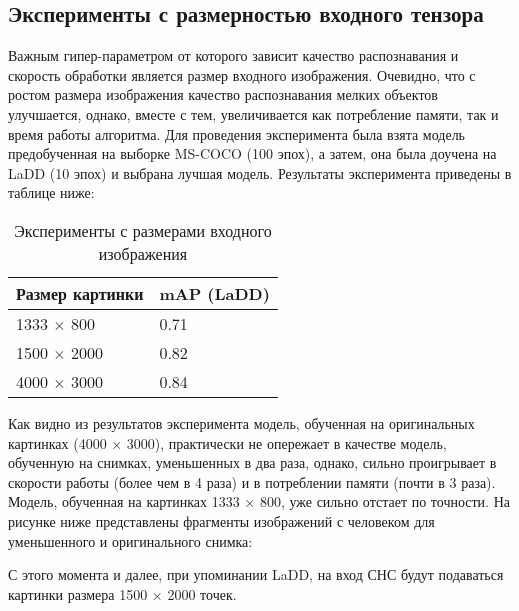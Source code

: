 \subsection{Эксперименты с размерностью входного тензора}

Важным гипер-параметром от которого зависит качество распознавания и скорость обработки является размер входного изображения. Очевидно, что с ростом размера изображения качество распознавания мелких объектов улучшается, однако, вместе с тем, увеличивается как потребление памяти, так и время работы алгоритма. Для проведения эксперимента была взята модель предобученная на выборке MS-COCO (100 эпох), а затем, она была доучена на LaDD (10 эпох) и выбрана лучшая модель. Результаты эксперимента приведены в таблице ниже:

\begin{table}[H]
    \caption{Эксперименты с размерами входного изображения}\label{image-size-table}
    \begin{tabular}{|p{7cm}|p{5cm}|}
        \hline
        {Размер картинки} & {mAP (LaDD)} \\
        \hline
        1333 $\times$ 800 & 0.71 \\
        \hline
        1500 $\times$ 2000 & 0.82 \\
        \hline
        4000 $\times$ 3000 & 0.84 \\
        \hline
    \end{tabular}
\end{table}

Как видно из результатов эксперимента модель, обученная на оригинальных картинках (4000 $\times$ 3000), практически не опережает в качестве модель, обученную на снимках, уменьшенных в два раза, однако, сильно проигрывает в скорости работы (более чем в 4 раза) и в потреблении памяти (почти в 3 раза). Модель, обученная на картинках 1333 $\times$ 800, уже сильно отстает по точности. На рисунке ниже представлены фрагменты изображений с человеком для уменьшенного и оригинального снимка:


С этого момента и далее, при упоминании LaDD, на вход СНС будут подаваться картинки размера 1500 $\times$ 2000 точек.